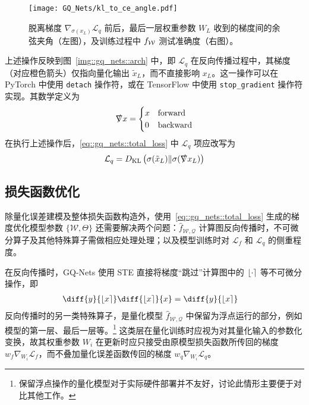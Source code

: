 \begin{figure}[htb]
  \centering
  \texttt{[image: GQ\_Nets/kl\_to\_ce\_angle.pdf]}
  \caption{脱离梯度 $\nabla_{\sigma(x_L)}\mathcal{L}_q$ 前后，最后一层权重参数 $W_L$ 收到的梯度间的余弦夹角（左图），及训练过程中 $f_{\mathcal{W}}$ 测试准确度（右图）。}
  \label{img::gq_nets::detach_grad_cos}
\end{figure}

上述操作反映到图~\ref{img::gq_nets::arch} 中，即 $\mathcal{L}_q$ 在反向传播过程中，其梯度（对应橙色箭头）仅指向量化输出 $\tilde{x}_L$，而不直接影响 $x_L$。这一操作可以在 PyTorch 中使用 \verb|detach| 操作符，或在 TensorFlow 中使用 \verb|stop_gradient| 操作符实现。其数学定义为
\begin{align}
  \slashed{\nabla} x =
    \begin{cases}
      x & \text{forward} \\
      0 & \text{backward}
    \end{cases}
\end{align}
在执行上述操作后，\eqref{eq::gq_nets::total_loss} 中 $\mathcal{L}_q$ 项应改写为
\begin{align}
  \mathcal{L}_q = D_{\mathrm{KL}}\left( \sigma(\tilde{x}_L) \| \sigma(\slashed{\nabla} x_L) \right)
\end{align}
\subsection{损失函数优化}
除量化误差建模及整体损失函数构造外，使用~\eqref{eq::gq_nets::total_loss} 生成的梯度优化模型参数 $\{\mathcal{W}, \Theta\}$ 还需要解决两个问题：$\hat{f}_{\mathcal{W, Q}}$ 计算图反向传播时，不可微分算子及其他特殊算子需做相应处理处理；以及模型训练时对 $\mathcal{L}_f$ 和 $\mathcal{L}_q$ 的侧重程度。

在反向传播时，GQ-Nets 使用 STE 直接将梯度“跳过”计算图中的 $\left\lfloor \cdot \right\rceil$ 等不可微分操作，即
\begin{align}
  \diff{y}{\Round{x}} \diff{\Round{x}}{x} &= \diff{y}{\Round{x}}
\end{align}
反向传播时的另一类特殊算子，是量化模型 $\hat{f}_{\mathcal{W, Q}}$ 中保留为浮点运行的部分，例如模型的第一层、最后一层等。\footnote{保留浮点操作的量化模型对于实际硬件部署并不友好，讨论此情形主要便于对比其他工作。} 这类层在量化训练时应视为对其量化输入的参数化变换，故其权重参数 $W_i$ 在更新时应只接受由原模型损失函数所传回的梯度 $w_f \nabla_{W_i}\mathcal{L}_f$，而不叠加量化误差函数传回的梯度 $w_q \nabla_{W_i}\mathcal{L}_q$。

